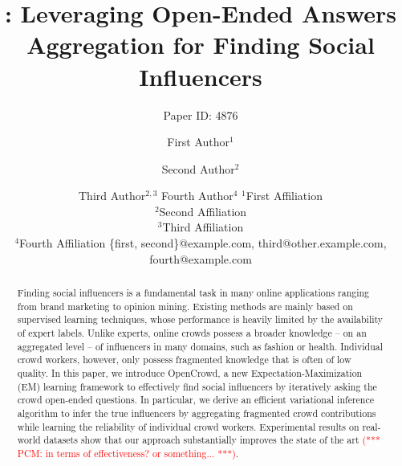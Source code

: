 \documentclass{article}
\title{\sys: Leveraging Open-Ended Answers Aggregation for Finding Social Influencers}
\author{
Paper ID: 4876
}
\author{
First Author$^1$
\and
Second Author$^2$\and
Third Author$^{2,3}$\And
Fourth Author$^4$
\affiliations
$^1$First Affiliation\\
$^2$Second Affiliation\\
$^3$Third Affiliation\\
$^4$Fourth Affiliation
\emails
\{first, second\}@example.com,
third@other.example.com,
fourth@example.com
}
\newcommand{\sys}{OpenCrowd\xspace}
\newcommand{\pcm}[1]{\textcolor{red}{(*** PCM: #1 ***)}}
\begin{document}
\maketitle

\begin{abstract}
Finding social influencers is a fundamental task in many online applications ranging from brand marketing to opinion mining. Existing methods are mainly based on supervised learning techniques, whose performance is heavily limited by the availability of expert labels. Unlike experts, online crowds possess a  broader knowledge -- on an aggregated level -- of influencers in many domains, such as fashion or health. Individual crowd workers, however, only possess fragmented knowledge that is often of low quality. In this paper, we introduce \sys, a new Expectation-Maximization (EM) learning framework to effectively find social influencers by iteratively asking the crowd open-ended questions. In particular, we derive an efficient variational inference algorithm to infer the true influencers by aggregating fragmented crowd contributions while learning the reliability of individual crowd workers. Experimental results on real-world datasets show that our approach substantially improves the state of the art \pcm{in terms of effectiveness? or something...}.
\end{abstract}





\label{sec:intro}


\label{sec:problem}


\label{sec:method}


\label{sec:result}


\label{sec:related}


\label{sec:conclusion}









\end{document}
